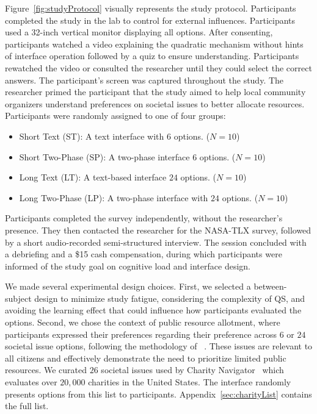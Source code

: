 Figure~\ref{fig:studyProtocol} visually represents the study protocol. Participants completed the study in the lab to control for external influences. Participants used a 32-inch vertical monitor displaying all options. After consenting, participants watched a video explaining the quadratic mechanism without hints of interface operation followed by a quiz to ensure understanding. Participants rewatched the video or consulted the researcher until they could select the correct answers. The participant's screen was captured throughout the study. The researcher primed the participant that the study aimed to help local community organizers understand preferences on societal issues to better allocate resources. Participants were randomly assigned to one of four groups:

\begin{itemize}
    \item Short Text (ST): A text interface with $6$ options. ($N=10$)
    \item Short Two-Phase (SP): A two-phase interface $6$ options. ($N=10$)
    \item Long Text (LT): A text-based interface $24$ options. ($N=10$)
    \item Long Two-Phase (LP): A two-phase interface with $24$ options. ($N=10$)
\end{itemize}

Participants completed the survey independently, without the researcher's presence. They then contacted the researcher for the NASA-TLX survey, followed by a short audio-recorded semi-structured interview. The session concluded with a debriefing and a \$15 cash compensation, during which participants were informed of the study goal on cognitive load and interface design.

We made several experimental design choices. First, we selected a between-subject design to minimize study fatigue, considering the complexity of QS, and avoiding the learning effect that could influence how participants evaluated the options. Second, we chose the context of public resource allotment, where participants expressed their preferences regarding their preference across $6$ or $24$ societal issue options, following the methodology of ~\textcite{chengCanShowWhat2021}. These issues are relevant to all citizens and effectively demonstrate the need to prioritize limited public resources. We curated $26$ societal issues used by Charity Navigator~\cite{CharityNavigator2023} which evaluates over $20,000$ charities in the United States. The interface randomly presents options from this list to participants. Appendix~\ref{sec:charityList} contains the full list.

